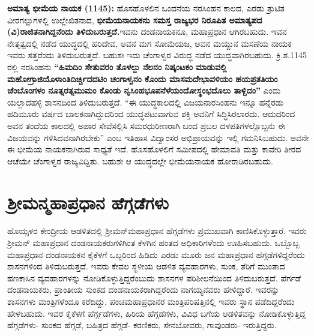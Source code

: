 \textbf{ಅಮಾತ್ಯ ಭೀಮೆಯ ನಾಯಕ (1145):} ಹೊಸಹೊಳಲಿನ ಒಂದನೆಯ ನರಸಿಂಹನ ಕಾಲದ, ಎರಡು ತ್ರುಟಿತ ವೀರಗಲ್ಲುಗಳಲ್ಲಿ ಉಲ್ಲೇಖಿತನಾದ,\textbf{ ಭೀಮೆಯನಾಯಕನು ಸಮಸ್ತ ರಾಜ್ಯಭರ ನಿರೂಪಿತ ಅಮಾತ್ಯಪದ (ವಿ)ರಾಜಿತನಾಗಿದ್ದನೆಂದು ತಿಳಿದುಬರುತ್ತದೆ.}ಇವನು ದಂಡನಾಯಕನೂ, ಮಹಾಪ್ರಧಾನ ಆಗಿರಬಹುದು. ಇವನ ನೇತೃತ್ವದಲ್ಲಿ ನಡೆದ ಯುದ್ಧದಲ್ಲಿ ಹರಿದೇವ, ಅವನ ಮಗ ಸೋಮೆಯಜ, ಅವನ ಮಯ್ದುನ ಮಸಣೆಯ ನಾಯಕ ಇವರು ಸತ್ತರೆಂದು ತಿಳಿದುಬರುತ್ತದೆ. ಬಹುಶಃ ಇದು ಚೆಂಗಾಳ್ವರ ವಿರುದ್ಧ ನಡೆದ ಯುದ್ಧವಾಗಿರಬಹುದು. ಕ್ರಿ.ಶ.1145 ರಲ್ಲಿ ನರಸಿಂಹನು \textbf{“ಹಿಮದಿಂ ಸೇತುವರಂ ತೊಳಲ್ದು ನೆಲನಂ ನಿಷ್ಕಂಟಕಂ ಮಾಡುವಲ್ಲಿ ಮಹೋಗ್ರಾಜಿಯೊಳಾಂತಿದಿರ್ಚ್ಚಿದದಟಿಂ ಚಂಗಾಳ್ವನಂ ಕೊಂದು ಮಾಸಮದೇಭಾವಳಿಯಂ ಹಯಪ್ರತತಿಯಂ ಚೆಂಬೊಂಗಳಂ ನೂತ್ನರತ್ನಮುಮಂ ಕೊಂಡು ನೃಸಿಂಹಭೂಪನೆಳೆಯಂದೋಸ್ಥಂಭದೊಲು ತಾಳ್ದಿದಂ”} ಎಂದು ಯಲ್ಲಾದಹಳ್ಳಿ ಶಾಸನದಿಂದ ತಿಳಿದುಬರುತ್ತದೆ. “ಈ ಯುದ್ಧಕಾಲದಲ್ಲಿ ವಿಜಯನಾರಸಿಂಹನು ಇನ್ನೂ ಹನ್ನೆರಡು ಹದಿಮೂರು ವರ್ಷದ ಬಾಲಕನಾಗಿದ್ದುದರಿಂದ ಯುದ್ಧಪಟುವಾಗುವ ಶಕ್ತಿ ಅವನಿಗೆ ಸಿದ್ಧಿಸಿರಲಾರದು. ಆದುದರಿಂದ ಅವನ ತಂದೆಯ ಕಾಲದಲ್ಲಿ ಅಪಾರ ಸೇವೆಸಲ್ಲಿಸಿ ಸಮರಧುರೀಣರಾಗಿ ಬಂದ ಪ್ರಬಲ ದಳಪತಿಗಳಲ್ಲೊಬ್ಬನು ಈ ವಿಜಯವನ್ನು ಗಳಿಸಿದವನಾಗಿರಬೇಕು” ಎಂಬ ಇತಿಹಾಸ ವಿದ್ವಾಂಸರ ಅಭಿಪ್ರಾಯವನ್ನು ಇಲ್ಲಿ ಗಮನಿಸಿಬಹುದು. ಅವನೇ ಈ ಭೀಮೆಯ ನಾಯಕನಾಗಿರುವ ಸಾಧ್ಯತೆ ಇದೆ. ಹೊಸಹೊಳಲಿಗೆ ಸಮೀಪದಲ್ಲಿ ಹೇಮಾವತಿ ಮತ್ತು ಕಾವೇರಿ ತೀರದ ಆಚೆಯೇ ಚೆಂಗಾಳ್ವರ ರಾಜ್ಯವಿದ್ದಿತು. ಬಹುಶಃ ಆ ಯುದ್ಧದಲ್ಲೇ ಭೀಮೆಯನಾಯಕ ಹೋರಾಡಿರಬಹುದು.


\section*{ಶ‍್ರೀಮನ್ಮಹಾಪ್ರಧಾನ ಹೆಗ್ಗಡೆಗಳು}

ಹೊಯ್ಸಳರ ಕೇಂದ್ರೀಯ ಆಡಳಿತದಲ್ಲಿ ಶ‍್ರೀಮನ್​ಮಹಾಪ್ರಧಾನ ಹೆಗ್ಗಡೆಗಳು ಪ್ರಮುಖವಾಗಿ ಕಾಣಿಸಿಕೊಳ್ಳುತ್ತಾರೆ. ಇವರು ಶ‍್ರೀಮನ್​ ಮಹಾಪ್ರಧಾನ ದಂಡನಾಯಕರುಗಳಿಗಿಂತ ಕೆಳಗಿನ ಹಂತದ ಅಧಿಕಾರಿಗಳೆಂದು ಊಹಿಸಬಹುದು. ಒಬ್ಬೊಬ್ಬ ಮಹಾಪ್ರಧಾನ ದಂಡನಾಯಕನ ಕೈಕೆಳಗೆ ಒಬ್ಬರಿಂದ ಹಿಡಿದು ಎರಡು ಮೂರು ಜನ ಮಹಾಪ್ರಧಾನ ಹೆಗ್ಗಡೆಗಳಿದ್ದರೆಂದು ಶಾಸನಗಳಿಂದ ತಿಳಿದುಬರುತ್ತದೆ. ಇವರು ಕೇವಲ ಸ್ಥಳೀಯ ಆಡಳಿತ ವ್ಯವಹಾರಗಳು, ಸುಂಕ, ತೆರಿಗೆ ಮುಂತಾದ ಹಣಕಾಸಿನ ವ್ಯವಹಾರಗಳನ್ನು ನೋಡಿಕೊಳ್ಳುತ್ತಿದ್ದರೆಂಬುದು ಶಾಸನಗಳ ಪರಿಶೀಲನೆಯಿಂದ ತಿಳಿದುಬರುತ್ತದೆ. ಪೆರ್ಗಡೆ ದಂಡನಾಯಕರು, ಪ್ರಾಂತೀಯ ಸುಂಕದ ದಂಡನಾಯಕರಾಗಿದ್ದರೆಂದು ನಾಗಯ್ಯನವರು ಹೇಳಿದ್ದಾರೆ. ಇವರನ್ನು ಶಾಸನಗಳು ಮಂತ್ರಿಗಳೆಂದೂ ಕರೆದಿದ್ದು, ಪಂಚಮಹಾಪ್ರಧಾನರ ಮಂತ್ರಿಪರಿಷತ್ತಿನಲ್ಲಿ ಇವರು ಸ್ಥಾನ ಪಡೆದಿದ್ದರೆಂದು ಹೇಳಬಹುದು. ಇವರ ಕೈಕೆಳಗೆ ಪೆರ್ಗ್ಗಡೆಗಳು, ಹಿರಿಯ ಹೆಗ್ಗಡೆಗಳು, ವಿವಿಧ ಬಗೆಯ ಆಡಳಿತವನ್ನು ನೋಡಿಕೊಳ್ಳುತ್ತಿದ್ದ ಹೆಗ್ಗಡೆಗಳು- ಸುಂಕದ ಹೆಗ್ಗಡೆ, ಬಹಿತ್ರದ ಹೆಗ್ಗಡೆ- ಕರಣಿಕರು, ಸೇನಬೋವರು, ಗಾವುಂಡರು- ಇರುತ್ತಿದ್ದರು.

